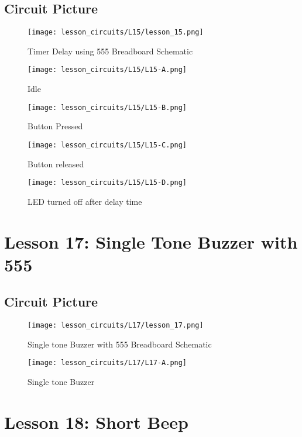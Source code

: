 \subsection{Circuit Picture}
\begin{figure}[htp]
    \centering
    \texttt{[image: lesson\_circuits/L15/lesson\_15.png]}
    \caption{Timer Delay using 555 Breadboard Schematic}
    \label{fig:555_timer_sch}
\end{figure}
\begin{figure}[htp]
    \centering
    \texttt{[image: lesson\_circuits/L15/L15-A.png]}
    \caption{Idle}
    \label{fig:555_timer_obb}
\end{figure}
\begin{figure}[htp]
    \centering
    \texttt{[image: lesson\_circuits/L15/L15-B.png]}
    \caption{Button Pressed}
    \label{fig:555_timer_obb1}
\end{figure}
\begin{figure}[htp]
    \centering
    \texttt{[image: lesson\_circuits/L15/L15-C.png]}
    \caption{Button released}
    \label{fig:555_timer_obb2}
\end{figure}
\begin{figure}[htp]
    \centering
    \texttt{[image: lesson\_circuits/L15/L15-D.png]}
    \caption{LED turned off after delay time}
    \label{fig:555_timer_obb3}
\end{figure}
\section{Lesson 17: Single Tone Buzzer with 555}
\subsection{Circuit Picture}
\begin{figure}[htp]
    \centering
    \texttt{[image: lesson\_circuits/L17/lesson\_17.png]}
    \caption{Single tone Buzzer with 555 Breadboard Schematic}
    \label{fig:555_sbuz_sch}
\end{figure}
\begin{figure}[htp]
    \centering
    \texttt{[image: lesson\_circuits/L17/L17-A.png]}
    \caption{Single tone Buzzer}
    \label{fig:555_sbuz_obb}
\end{figure}
\section{Lesson 18: Short Beep}
